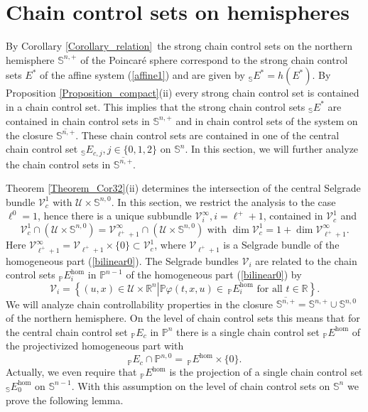 \documentclass[preprint,12pt]{elsarticle}
\begin{document}
\section{Chain control sets on hemispheres\label{Section6}}

By Corollary \ref{Corollary_relation}\ the strong chain control sets on the
northern hemisphere $\mathbb{S}^{n,+}$ of the Poincar\'{e} sphere correspond
to the strong chain control sets $E^{\ast}$ of the affine system
(\ref{affine1}) and are given by $_{\mathbb{S}}E^{\ast}=h(E^{\ast})$. By
Proposition \ref{Proposition_compact}(ii) every strong chain control set is
contained in a chain control set. This implies that the strong chain control
sets $_{\mathbb{S}}E^{\ast}$ are contained in chain control sets in
$\mathbb{S}^{n,+}$ and in chain control sets of the system on the closure
$\overline{\mathbb{S}^{n,+}}$. These chain control sets are contained in one
of the central chain control set $_{\mathbb{S}}E_{c,j},j\in\{0,1,2\}$ on
$\mathbb{S}^{n}$. In this section, we will further analyze the chain control
sets in $\overline{\mathbb{S}^{n,+}}$.

Theorem \ref{Theorem_Cor32}(ii) determines the intersection of the central
Selgrade bundle $\mathcal{V}_{c}^{1}$ with $\mathcal{U}\times\mathbb{S}^{n,0}%
$. In this section, we restrict the analysis to the case $\ell^{0}=1$, hence
there is a unique subbundle $\mathcal{V}_{i}^{\infty},i=\ell^{+}+1$, contained
in $\mathcal{V}_{c}^{1}$ and%
\[
\mathcal{V}_{c}^{1}\cap\left(  \mathcal{U}\times\mathbb{S}^{n,0}\right)
=\mathcal{V}_{\ell^{+}+1}^{\infty}\cap\left(  \mathcal{U}\times\mathbb{S}%
^{n,0}\right)  \text{ with }\dim\mathcal{V}_{c}^{1}=1+\dim\mathcal{V}%
_{\ell^{+}+1}^{\infty}.
\]
Here $\mathcal{V}_{\ell^{+}+1}^{\infty}=\mathcal{V}_{\ell^{+}+1}%
\times\{0\}\subset\mathcal{V}_{c}^{1}$, where $\mathcal{V}_{\ell^{+}+1}$ is a
Selgrade bundle of the homogeneous part (\ref{bilinear0}). The Selgrade
bundles $\mathcal{V}_{i}$ are related to the chain control sets $_{\mathbb{P}%
}E_{i}^{\hom}$ in $\mathbb{P}^{n-1}$ of the homogeneous part (\ref{bilinear0})
by%
\[
\mathcal{V}_{i}=\left\{  (u,x)\in\mathcal{U}\times\mathbb{R}^{n}\left\vert
\mathbb{P}\varphi(t,x,u)\in\,_{\mathbb{P}}E_{i}^{\hom}\text{ for all }%
t\in\mathbb{R}\right.  \right\}  .
\]
We will analyze chain controllability properties in the closure $\overline
{\mathbb{S}^{n,+}}=\mathbb{S}^{n,+}\cup\mathbb{S}^{n,0}$ of the northern
hemisphere. On the level of chain control sets this means that for the central
chain control set $_{\mathbb{P}}E_{c}$ in $\mathbb{P}^{n}$ there is a single
chain control set $_{\mathbb{P}}E^{\hom}$ of the projectivized homogeneous
part with%
\[
_{\mathbb{P}}E_{c}\cap\mathbb{P}^{n,0}=\,_{\mathbb{P}}E^{\hom}\times\{0\}.
\]
Actually, we even require that $_{\mathbb{P}}E^{\hom}$ is the projection of a
single chain control set $_{\mathbb{S}}E_{0}^{\hom}$ on $\mathbb{S}^{n-1}$.
With this assumption on the level of chain control sets on $\mathbb{S}^{n}$ we
prove the following lemma.
\end{document}

